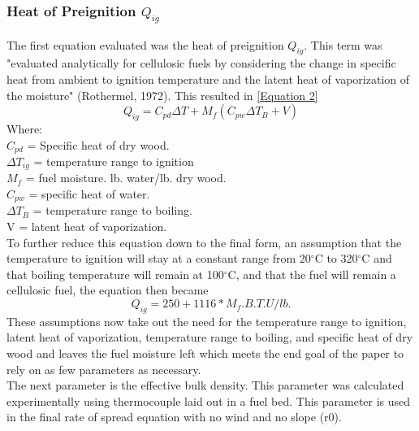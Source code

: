 \documentclass{article}
\begin{document}
\subsubsection{Heat of Preignition $Q_{ig}$}
\indent The first equation evaluated was the heat of preignition $Q_{ig}$. This term was "evaluated analytically for cellulosic fuels by considering the change in specific heat from ambient to ignition temperature and the latent heat of vaporization of the moisture" (Rothermel, 1972). This resulted in \ref{Equation 2}
\begin{equation}
	\label{Equation 2}
	Q_{ig} = C_{pd}\Delta T + M_f (C_{pw} \Delta T_B + V)
\end{equation}
Where: \\
$C_{pd}$ = Specific heat of dry wood. \\
$\Delta T_{ig}$ = temperature range to ignition \\
$M_f$ = fuel moisture. lb. water/lb. dry wood. \\
$C_{pw}$ = specific heat of water. \\
$\Delta T_B$ = temperature range to boiling. \\
V = latent heat of vaporization. \\
To further reduce this equation down to the final form, an assumption that the temperature to ignition will stay at a constant range from 20$^{\circ}$C to 320$^{\circ}$C and that boiling temperature will remain at 100$^{\circ}$C, and that the fuel will remain a cellulosic fuel, the equation then became 
\begin{equation}
\label{Equation 3}
	Q_{ig} = 250 + 1116 * M_f. B.T.U/lb. 
\end{equation}
\indent These assumptions now take out the need for the temperature range to ignition, latent heat of vaporization, temperature range to boiling, and specific heat of dry wood and leaves the fuel moisture left which meets the end goal of the paper to rely on as few parameters as necessary. \\
\indent The next parameter is the effective bulk density. This parameter was calculated experimentally using thermocouple laid out in a fuel bed. This parameter is used in the final rate of spread equation with no wind and no slope (r0). \\
\end{document}
